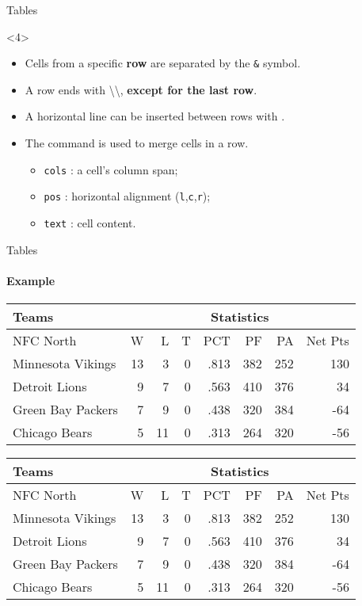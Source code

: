 \begin{frame}[fragile]{Tables}
	\begin{onlyenv}
		\begin{itemize}
			\item Cells from a specific \textbf{row} are separated by the \texttt{\&} symbol.
			\item A row ends with \textbackslash\textbackslash, \textbf{except for the last row}.
			\item A horizontal line can be inserted between rows with .
			\item The  command is used to merge cells in a row.
			\begin{itemize}
				\scriptsize
				\item \texttt{cols} : a cell's column span;
				\item \texttt{pos} : horizontal alignment (\texttt{l},\texttt{c},\texttt{r});
				\item \texttt{text} : cell content.
			\end{itemize}
		\end{itemize}
	\end{onlyenv}
	
\end{frame}

\begin{frame}[fragile,c]{Tables}
	\framesubtitle{Example}
\begin{codesource}
	\begin{tabularx}{\textwidth}{X|rrr|r|rrr}
		\textbf{Teams}		&	\multicolumn{7}{c}{\textbf{Statistics}} \\
		\hline\hline
		NFC North			&	W	&	L	&	T	&	PCT		&	PF	&	PA	&	Net Pts \\
		\hline
		Minnesota Vikings	&	13	&	3	&	0	&	.813	&	382	&	252	&	130 \\
		Detroit Lions		&	9	&	7	&	0	&	.563	&	410	&	376	&	34 \\
		Green Bay Packers	&	7	&	9	& 	0	&	.438	&	320	&	384	&	-64 \\
		Chicago Bears		&	5	&	11	&	0	&	.313	&	264	&	320	&	-56
	\end{tabularx}
\end{codesource}

	\begin{tabularx}{\textwidth}{X|rrr|r|rrr}
		\textbf{Teams}		&	\multicolumn{7}{c}{\textbf{Statistics}} \\
		\hline\hline
		NFC North			&	W	&	L	&	T	&	PCT		&	PF	&	PA	&	Net Pts \\
		\hline
		Minnesota Vikings	&	13	&	3	&	0	&	.813	&	382	&	252	&	130 \\
		Detroit Lions		&	9	&	7	&	0	&	.563	&	410	&	376	&	34 \\
		Green Bay Packers	&	7	&	9	& 	0	&	.438	&	320	&	384	&	-64 \\
		Chicago Bears		&	5	&	11	&	0	&	.313	&	264	&	320	&	-56
	\end{tabularx}
\end{frame}

